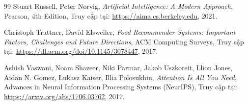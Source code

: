 \begin{thebibliography}{99}
Stuart Russell, Peter Norvig, \textit{Artificial Intelligence: A Modern Approach}, Pearson, 4th Edition, Truy cập tại: \url{https://aima.cs.berkeley.edu}, 2021.

Christoph Trattner, David Elsweiler, \textit{Food Recommender Systems: Important Factors, Challenges and Future Directions}, ACM Computing Surveys, Truy cập tại: \url{https://dl.acm.org/doi/10.1145/3078447}, 2017.

Ashish Vaswani, Noam Shazeer, Niki Parmar, Jakob Uszkoreit, Llion Jones, Aidan N. Gomez, Łukasz Kaiser, Illia Polosukhin, \textit{Attention Is All You Need}, Advances in Neural Information Processing Systems (NeurIPS), Truy cập tại: \url{https://arxiv.org/abs/1706.03762}, 2017.

\end{thebibliography}
